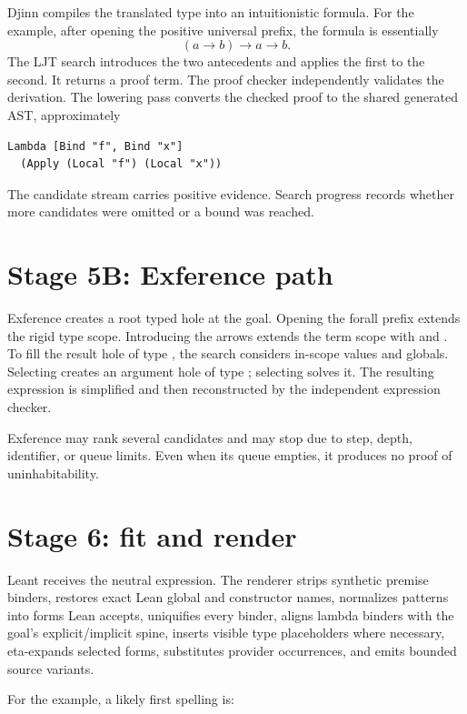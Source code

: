 \documentclass[10pt,letterpaper,oneside]{report}
\newcommand{\code}[1]{\texttt{\detokenize{#1}}}
\begin{document}
Djinn compiles the translated type into an intuitionistic formula. For the example, after opening the positive universal prefix, the formula is essentially
\[
  (a \to b) \to a \to b.
\]
The LJT search introduces the two antecedents and applies the first to the second. It returns a proof term. The proof checker independently validates the derivation. The lowering pass converts the checked proof to the shared generated AST, approximately

\begin{lstlisting}[language=Haskellish]
Lambda [Bind "f", Bind "x"]
  (Apply (Local "f") (Local "x"))
\end{lstlisting}

The candidate stream carries positive evidence. Search progress records whether more candidates were omitted or a bound was reached.

\section{Stage 5B: Exference path}

Exference creates a root typed hole at the goal. Opening the forall prefix extends the rigid type scope. Introducing the arrows extends the term scope with \code{f} and \code{x}. To fill the result hole of type \code{b}, the search considers in-scope values and globals. Selecting \code{f : a -> b} creates an argument hole of type \code{a}; selecting \code{x : a} solves it. The resulting expression is simplified and then reconstructed by the independent expression checker.

Exference may rank several candidates and may stop due to step, depth, identifier, or queue limits. Even when its queue empties, it produces no proof of uninhabitability.

\section{Stage 6: fit and render}

Leant receives the neutral expression. The renderer strips synthetic premise binders, restores exact Lean global and constructor names, normalizes patterns into forms Lean accepts, uniquifies every binder, aligns lambda binders with the goal's explicit/implicit spine, inserts visible type placeholders where necessary, eta-expands selected forms, substitutes provider occurrences, and emits bounded source variants.

For the example, a likely first spelling is:
\end{document}
